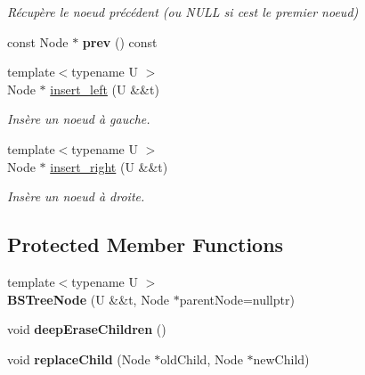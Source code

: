 \begin{DoxyCompactItemize}
\begin{DoxyCompactList}\small\item\em Récupère le noeud précédent (ou N\+U\+LL si c\textquotesingle{}est le premier noeud) \end{DoxyCompactList}\item 
\mbox{\label{classBSTreeNode_a8fdc7c579693763ee554b2a7c3ff34a3}} 
const Node $\ast$ {\bfseries prev} () const
\item 
\mbox{\label{classBSTreeNode_a85987179fb53e998efa895d3b181916c}} 
{\footnotesize template$<$typename U $>$ }\\Node $\ast$ \hyperlink{classBSTreeNode_a85987179fb53e998efa895d3b181916c}{insert\+\_\+left} (U \&\&t)
\begin{DoxyCompactList}\small\item\em Insère un noeud à gauche. \end{DoxyCompactList}\item 
\mbox{\label{classBSTreeNode_a6048387f72db53ce0ed8567a570c468e}} 
{\footnotesize template$<$typename U $>$ }\\Node $\ast$ \hyperlink{classBSTreeNode_a6048387f72db53ce0ed8567a570c468e}{insert\+\_\+right} (U \&\&t)
\begin{DoxyCompactList}\small\item\em Insère un noeud à droite. \end{DoxyCompactList}\end{DoxyCompactItemize}
\subsection*{Protected Member Functions}
\begin{DoxyCompactItemize}
\item 
\mbox{\label{classBSTreeNode_ac25c7c68f27e3372510d4ebf3caf920c}} 
{\footnotesize template$<$typename U $>$ }\\{\bfseries B\+S\+Tree\+Node} (U \&\&t, Node $\ast$parent\+Node=nullptr)
\item 
\mbox{\label{classBSTreeNode_a8e95ffc728076e81c1bbccfeb47a26f7}} 
void {\bfseries deep\+Erase\+Children} ()
\item 
\mbox{\label{classBSTreeNode_a128a6509a2779f97a83b91cf3c9ed6b0}} 
void {\bfseries replace\+Child} (Node $\ast$old\+Child, Node $\ast$new\+Child)
\end{DoxyCompactItemize}

